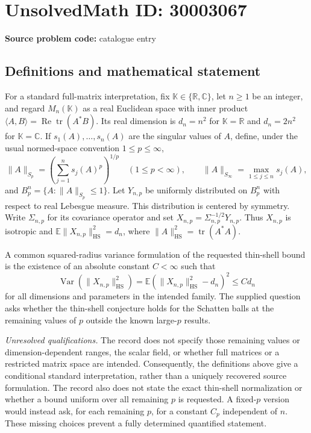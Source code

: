 \documentclass[11pt]{article}
\newcommand{\R}{\mathbb{R}}
\newcommand{\C}{\mathbb{C}}
\newcommand{\E}{\mathbb{E}}
\begin{document}
\section*{UnsolvedMath ID: 30003067}
\textbf{Source problem code:} catalogue entry
\subsection{Definitions and mathematical statement}
For a standard full-matrix interpretation, fix \(\mathbb K\in\{\R,\C\}\), let \(n\geq 1\) be an integer, and regard \(M_n(\mathbb K)\) as a real Euclidean space with inner product \(\langle A,B\rangle=\operatorname{Re}\operatorname{tr}(A^*B)\). Its real dimension is \(d_n=n^2\) for \(\mathbb K=\R\) and \(d_n=2n^2\) for \(\mathbb K=\C\). If \(s_1(A),\ldots,s_n(A)\) are the singular values of \(A\), define, under the usual normed-space convention \(1\leq p\leq\infty\),
\[
\|A\|_{S_p}=\left(\sum_{j=1}^n s_j(A)^p\right)^{1/p}\quad(1\leq p<\infty),\qquad
\|A\|_{S_\infty}=\max_{1\leq j\leq n}s_j(A),
\]
and \(B_p^n=\{A:\|A\|_{S_p}\leq1\}\). Let \(Y_{n,p}\) be uniformly distributed on \(B_p^n\) with respect to real Lebesgue measure. This distribution is centered by symmetry. Write \(\Sigma_{n,p}\) for its covariance operator and set \(X_{n,p}=\Sigma_{n,p}^{-1/2}Y_{n,p}\). Thus \(X_{n,p}\) is isotropic and \(\E\|X_{n,p}\|_{\mathrm{HS}}^2=d_n\), where \(\|A\|_{\mathrm{HS}}^2=\operatorname{tr}(A^*A)\).

A common squared-radius variance formulation of the requested thin-shell bound is the existence of an absolute constant \(C<\infty\) such that
\[
\operatorname{Var}\!\left(\|X_{n,p}\|_{\mathrm{HS}}^2\right)
=\E\left(\|X_{n,p}\|_{\mathrm{HS}}^2-d_n\right)^2
\leq C d_n
\]
for all dimensions and parameters in the intended family. The supplied question asks whether the thin-shell conjecture holds for the Schatten balls at the remaining values of \(p\) outside the known large-\(p\) results.

\emph{Unresolved qualifications.} The record does not specify those remaining values or dimension-dependent ranges, the scalar field, or whether full matrices or a restricted matrix space are intended. Consequently, the definitions above give a conditional standard interpretation, rather than a uniquely recovered source formulation. The record also does not state the exact thin-shell normalization or whether a bound uniform over all remaining \(p\) is requested. A fixed-\(p\) version would instead ask, for each remaining \(p\), for a constant \(C_p\) independent of \(n\). These missing choices prevent a fully determined quantified statement.
\end{document}
